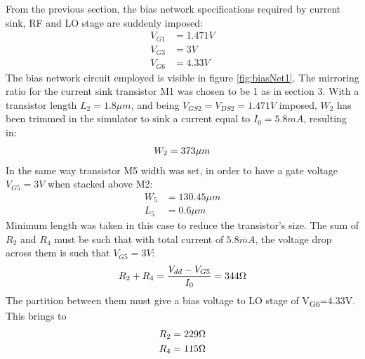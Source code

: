 From the previous section, the bias network specifications required by current sink, RF and LO stage are suddenly imposed:
\begin{align}                                                                    
	V_{G1}&=1.471 V \nonumber \\                                                    
	V_{G3}&=3 V \nonumber \\                                                        
	V_{G6}&=4.33 V \nonumber                                                        
\end{align}                                                                      
The bias network circuit employed is visible in figure \ref{fig:biasNet1}.                
The mirroring ratio for the current sink transistor M1 was chosen to be 1 as in section 3. With a transistor length \(L_2 = 1.8\mu m\), and being \(V_{GS2}=V_{DS2}=1.471V\) imposed, \(W_2\) has been trimmed in the simulator to sink a current equal to \(I_0=5.8mA\), resulting in:
\begin{align}
W_2=373\mu m \notag
\end{align} 
In the same way transistor M5 width was set, in order to have a gate voltage \(V_{G5}=3V\) when stacked above M2:
\begin{align}
	W_5&=130.45\mu m \nonumber\\
	L_5&=0.6\mu m \nonumber
\end{align}
Minimum length was taken in this case to reduce the transistor's size.
The sum of \(R_2\) and \(R_4\) must be such that with total current of \(5.8mA\), the voltage drop across them is such that \(V_{G5}=3V\):
\begin{align}
	R_2+R_4=\frac{V_{dd}-V_{G5}}{I_0} = 344\ohm \nonumber
\end{align}
The partition between them must give a bias voltage to LO stage of V\textsubscript{G6}=4.33V. This brings to
\begin{align}
	R_2=229\ohm\nonumber\\
	R_4=115\ohm\nonumber
\end{align}

